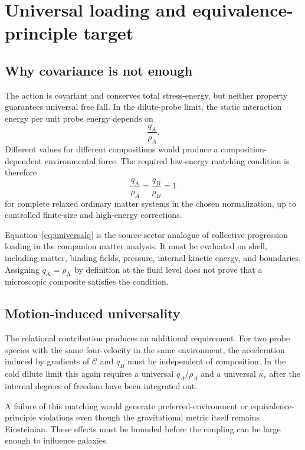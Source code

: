 \documentclass[11pt]{article}
\begin{document}
\section{Universal loading and equivalence-principle target}

\subsection{Why covariance is not enough}

The action is covariant and conserves total stress-energy, but neither property guarantees universal free fall.  In the dilute-probe limit, the static interaction energy per unit probe energy depends on
\begin{equation}
\frac{q_A}{\rho_A}.
\label{eq:qOverRho}
\end{equation}
Different values for different compositions would produce a composition-dependent environmental force.  The required low-energy matching condition is therefore
\begin{equation}
\boxed{
\frac{q_A}{\rho_A}
=\frac{q_B}{\rho_B}
=1
}
\label{eq:universalq}
\end{equation}
for complete relaxed ordinary matter systems in the chosen normalization, up to controlled finite-size and high-energy corrections.

Equation~\eqref{eq:universalq} is the source-sector analogue of collective progression loading in the companion matter analysis.  It must be evaluated on shell, including matter, binding fields, pressure, internal kinetic energy, and boundaries.  Assigning $q_X=\rho_X$ by definition at the fluid level does not prove that a microscopic composite satisfies the condition.

\subsection{Motion-induced universality}

The relational contribution produces an additional requirement.  For two probe species with the same four-velocity in the same environment, the acceleration induced by gradients of $\mathcal C$ and $q_B$ must be independent of composition.  In the cold dilute limit this again requires a universal $q_A/\rho_A$ and a universal $\kappa_r$ after the internal degrees of freedom have been integrated out.

A failure of this matching would generate preferred-environment or equivalence-principle violations even though the gravitational metric itself remains Einsteinian.  These effects must be bounded before the coupling can be large enough to influence galaxies.
\end{document}
